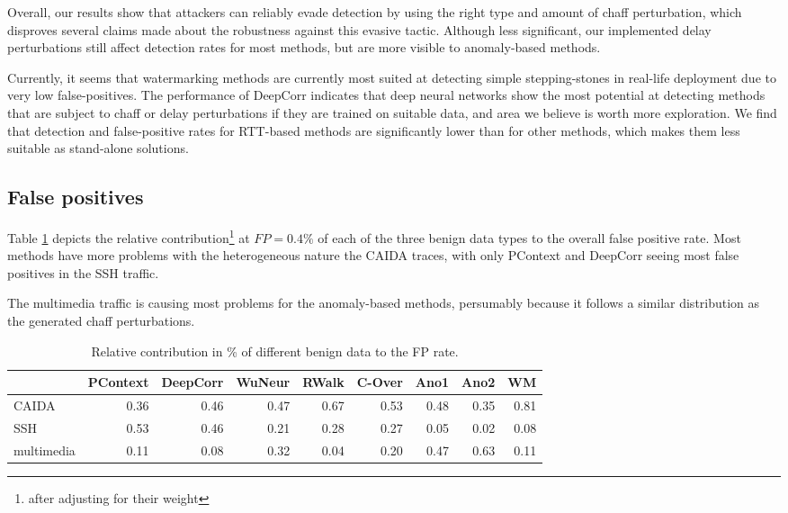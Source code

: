 \documentclass[runningheads,11pt]{llncs}\usepackage[]{graphicx}\usepackage[]{color}
\begin{document}
Overall, our results show that attackers can reliably evade detection by using the right type and amount of chaff perturbation, which disproves several claims made about the robustness against this evasive tactic. Although less significant, our implemented delay perturbations still affect detection rates for most methods, but are more visible to anomaly-based methods. 

Currently, it seems that watermarking methods are currently most suited at detecting simple stepping-stones in real-life deployment due to very low false-positives. The performance of DeepCorr indicates that deep neural networks show the most potential at detecting methods that are subject to chaff or delay perturbations if they are trained on suitable data, and area we believe is worth more exploration. We find that detection and false-positive rates for RTT-based methods are significantly lower than for other methods, which makes them less suitable as stand-alone solutions.

%



\appendix


\subsection{False positives}\label{Sec:FPana}

Table \ref{Tab:dfFP} depicts the relative contribution\footnote{after adjusting for their weight} at $FP=0.4\%$ of each of the three benign data types to the overall false positive rate. Most methods have more problems with the heterogeneous nature the CAIDA traces, with only PContext and DeepCorr seeing most false positives in the SSH traffic. 

The multimedia traffic is causing most problems for the anomaly-based methods, persumably because it follows a similar distribution as the generated chaff perturbations.
\begin{table}
\centering
\begin{tabular}{l|r|r|r|r|r|r|r|r}
  \hline
 & PContext & DeepCorr & WuNeur & RWalk & C-Over & Ano1 & Ano2 & WM \\ 
  \hline
CAIDA & 0.36 & 0.46 & 0.47 & 0.67 & 0.53 & 0.48 & 0.35 & 0.81 \\ 
  SSH & 0.53 & 0.46 & 0.21 & 0.28 & 0.27 & 0.05 & 0.02 & 0.08 \\ 
  multimedia & 0.11 & 0.08 & 0.32 & 0.04 & 0.20 & 0.47 & 0.63 & 0.11 \\ 
   \hline
\end{tabular}

\caption{Relative contribution in \% of different benign data to the FP rate.}\label{Tab:dfFP}
\end{table}
\end{document}
